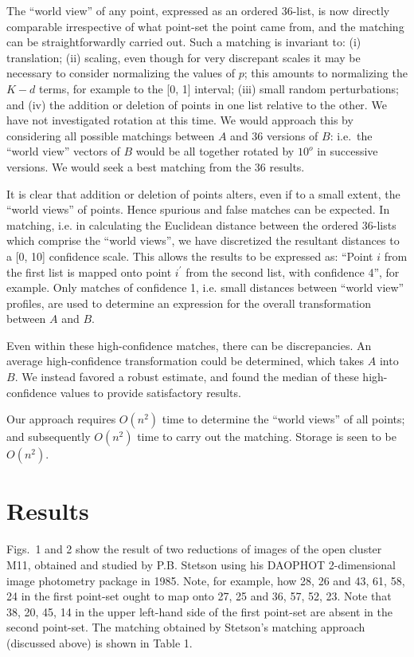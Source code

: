 The ``world view'' of any point, expressed as an ordered 36-list, is now
directly comparable irrespective of what point-set the point came from,
and the matching can be straightforwardly carried out.  Such
a matching is invariant to: (i) translation; (ii) scaling, even though
for very discrepant scales it may be necessary to consider normalizing the
values of $p$; this amounts to normalizing the $K - d$ terms, for example
to the [0, 1] interval; (iii) small random perturbations; and (iv) the addition
or deletion of points in one list relative to the other.  We have not 
investigated rotation at this time.  We would approach this by considering 
all possible
matchings between $A$ and 36 versions of $B$: i.e.\ the ``world view'' vectors
of $B$ would be all together rotated by $10^o$ in successive versions.  We 
would seek a best matching from the 36 results.

It is clear that addition or deletion of points alters, even if to a small
extent, the ``world views'' of points.  Hence spurious and false matches
can be expected.  In matching, i.e. in calculating the Euclidean distance
between the ordered 36-lists which comprise the ``world views'', we have
discretized the resultant distances to a [0, 10] confidence scale.  This 
allows the results to be expressed as: ``Point $i$ from the first list is
mapped onto point $i^{\prime}$ from the second list, with confidence 4'', for
example.  Only matches of confidence 1, i.e. small distances between
``world view'' profiles, are used to determine an expression for the 
overall transformation between $A$ and $B$.

Even within these high-confidence matches, there can be discrepancies.
An average high-confidence transformation could be determined, which takes 
$A$ into $B$.
We instead favored a robust estimate, and found the median of these
high-confidence values to provide satisfactory results.

Our approach requires $O(n^2)$ time to determine the ``world views'' of
all points; and subsequently $O(n^2)$ time to carry out the matching.  
Storage is seen to be $O(n^2)$.  

\section{Results}


Figs.\ 1 and 2 show the result of two reductions of images of the open cluster
M11, obtained and studied by P.B. Stetson using his DAOPHOT 2-dimensional image
photometry package in 1985.  Note, for
example, how 28, 26 and 43, 61, 58, 24 in the first point-set ought to map 
onto 27, 25 and 36, 57, 52, 23.  Note that 38, 20, 45, 14 in the upper
left-hand side of the first  point-set are absent in the second point-set.
The matching
obtained by Stetson's matching approach (discussed above) is shown in 
Table 1.

